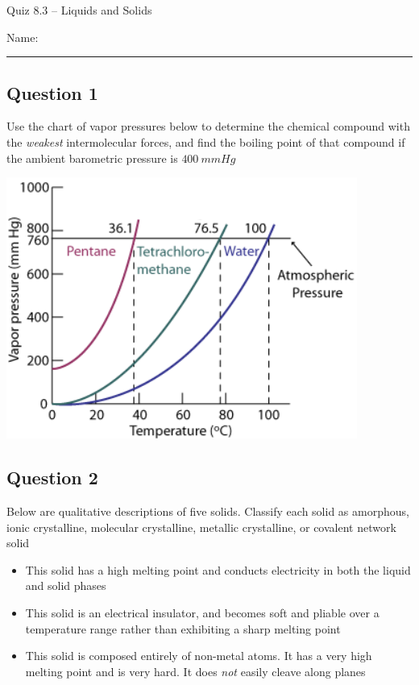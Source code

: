 \documentclass[11pt, letterpaper]{memoir}
\begin{document}
	\begin{center}
		{\large Quiz 8.3 --	Liquids and Solids}
	\end{center}
	{\large Name: \rule[-1mm]{4in}{.1pt} 

\subsection*{Question 1}
Use the chart of vapor pressures below to determine the chemical compound with the \emph{weakest} intermolecular forces, and find the boiling point of that compound if the ambient barometric pressure is $400~mmHg$	

\includegraphics{vaporpressure}

\vspace{2em}
\subsection*{Question 2}
Below are qualitative descriptions of five solids. Classify each solid as amorphous, ionic crystalline, molecular crystalline, metallic crystalline, or covalent network solid

\begin{itemize}
  \item This solid has a high melting point and conducts electricity in both the liquid and solid phases

    \vspace{2em}
  \item This solid is an electrical insulator, and becomes soft and pliable over a temperature range rather than exhibiting a sharp melting point

    \vspace{2em}
  \item This solid is composed entirely of non-metal atoms. It has a very high melting point and is very hard. It does \emph{not} easily cleave along planes


\end{itemize}}
\end{document}
